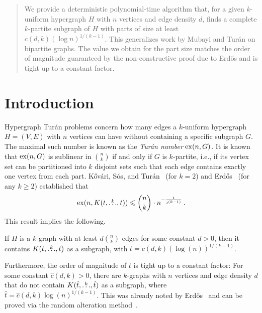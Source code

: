 \begin{abstract}
We provide a deterministic polynomial-time algorithm that, for a given $k$-uniform hypergraph $H$ with $n$ vertices and edge density $d$,
finds a complete $k$-partite subgraph of $H$ with parts of size at least ${c(d, k)(\log n)^{1/(k-1)}}$.
This generalizes work by Mubayi and Tur\'{a}n on bipartite graphs.
The value we obtain for the part size matches the order of magnitude guaranteed by the non-constructive proof due to
Erd\H{o}s and is tight up to a constant factor.
\end{abstract}

\maketitle


\section{Introduction}\label{sec:introduction}

Hypergraph Tur\'{a}n problems concern how many edges a $k$-uniform hypergraph $H = (V, E)$ with $n$ vertices can have without containing a specific subgraph $G$.
The maximal such number is known as the \emph{Tur\'{a}n number} $\mathrm{ex}(n, G)$.
It is known~\cite{keevash2011hypergraph}
that $\mathrm{ex}(n, G)$ is sublinear in $\binom{n}{k}$ if and only if $G$ is $k$-partite, i.e.,
if its vertex set can be partitioned into $k$ disjoint sets such that each edge contains exactly one vertex from each part.
Kőv\'{a}ri, S\'{o}s, and Tur\'{a}n~\cite{Kovari1954} (for $k=2$) and
Erd\H{o}s~\cite{Erdos1964} (for any $k \geq 2$) established that
\[ \label{eq:erdos64-intro}
    \mathrm{ex}(n, K(t, \overset{k}{\dots}, t)) \leqslant \binom{n}{k} \cdot n^{-\frac{1}{t^{(k-1)}}}\,.
\]
This result implies the following.

\begin{remark} \label{rk:order}
    If $H$ is a $k$-graph with at least $d \binom{n}{k}$ edges for some constant $d > 0$, then it contains $K(t, \overset{k}{\dots}, t)$
    as a subgraph, with $t = c(d, k) (\log(n))^{1/(k-1)}$.
\end{remark}

Furthermore, the order of magnitude of $t$ is tight up to a constant factor:
For some constant $\hat{c}(d, k) > 0$,
there are $k$-graphs with $n$ vertices and edge density
$d$ that do not contain $K(\hat{t}, \overset{k}{\dots}, \hat{t})$ as a subgraph, where
$\hat{t} = \hat{c}(d, k)\log(n)^{1/(k-1)}$.
This was already noted by Erd\H{o}s~\cite{Erdos1964} and can be proved via the random alteration method~\cite{alon2016probabilistic}.


